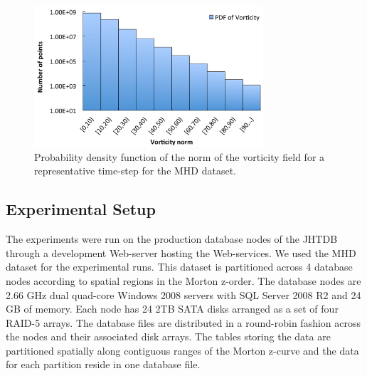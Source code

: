 \documentclass{sig-alternate}
\begin{document}
\begin{figure}
\centering
\includegraphics[width=3.35in]{Figures/PDF.pdf}
\caption{Probability density function of the norm of the vorticity field for a representative time-step for the MHD dataset.}
\label{fig:pdf}
\end{figure}

\subsection{Experimental Setup}
The experiments were run on the production database nodes of the JHTDB through a development Web-server hosting the Web-services. We used
the MHD dataset for the experimental runs. This dataset is partitioned across 4 database nodes according to spatial regions in the Morton z-order. 
The database nodes are 2.66 GHz dual quad-core Windows 2008 servers with SQL Server 2008 R2 and 24 GB of memory. Each node has 24 2TB 
SATA disks arranged as a set of four RAID-5 arrays. The database files are distributed in a round-robin fashion across the nodes and their associated disk
arrays. The tables storing the data are partitioned spatially along contiguous ranges of the Morton z-curve and the data for each partition reside in one
database file. 
\end{document}
